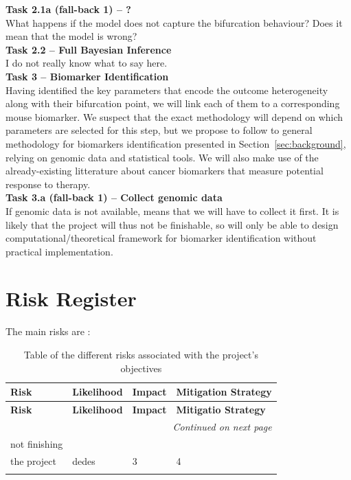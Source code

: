\documentclass[11pt]{article}
\begin{document}
%
\noindent\textbf{Task 2.1a (fall-back 1) -- ?}\\ 
What happens if the model does not capture the bifurcation behaviour? Does it mean that the model is wrong? \\[12pt]
%
\noindent\textbf{Task 2.2 -- Full Bayesian Inference}\\ 
I do not really know what to say here.\\[12pt]
%
\noindent\textbf{Task 3 -- Biomarker Identification}\\ 
Having identified the key parameters that encode the outcome heterogeneity along with their bifurcation point, we will link each of them to a corresponding mouse biomarker. We suspect that the exact methodology will depend on which parameters are selected for this step, but we propose to follow to general methodology for biomarkers identification presented in Section~\ref{sec:background}, relying on genomic data and statistical tools. We will also make use of the already-existing litterature about cancer biomarkers that measure potential response to therapy. \\[11pt]
%
\noindent\textbf{Task 3.a (fall-back 1) -- Collect genomic data}\\ 
If genomic data is not available, means that we will have to collect it first. It is likely that the project will thus not be finishable, so will only be able to design computational/theoretical framework for biomarker identification without practical implementation.  

\section{Risk Register}
The main risks are : 

\begin{longtable}{|p{3.5cm}|p{2.5cm}|p{4.5cm}|p{5cm}|}
    \hline
    \textbf{Risk} & \textbf{Likelihood} & \textbf{Impact} & \textbf{Mitigation Strategy}\\
    \hline
    \endfirsthead
    \hline
    \textbf{Risk} & \textbf{Likelihood} & \textbf{Impact} & \textbf{Mitigatio Strategy}\\
    \hline
    \endhead
    \hline
    \multicolumn{4}{|r|}{\textit{Continued on next page}} \\
    \hline
    \endfoot
    \hline
\endlastfoot
        \hline
        not finishing \\ the project & dedes & 3 & 4 \\ \hline 
    \caption{Table of the different risks associated with the project's objectives}
    \label{tbl:hyperparams}
\end{longtable}
\end{document}
